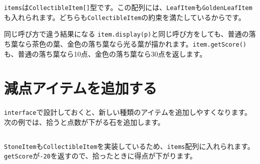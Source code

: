 \texttt{items}は\texttt{CollectibleItem[]}型です。この配列には、\texttt{LeafItem}も\texttt{GoldenLeafItem}も入れられます。どちらも\texttt{CollectibleItem}の約束を満たしているからです。

\begin{pointbox}{同じ呼び方で違う結果になる}
\texttt{item.display(p)}と同じ呼び方をしても、普通の落ち葉なら茶色の葉、金色の落ち葉なら光る葉が描かれます。\texttt{item.getScore()}も、普通の落ち葉なら10点、金色の落ち葉なら30点を返します。
\end{pointbox}

\section{減点アイテムを追加する}

\texttt{interface}で設計しておくと、新しい種類のアイテムを追加しやすくなります。次の例では、拾うと点数が下がる石を追加します。

\begin{listing}[htbp]
\inputminted{ts}{typescript-p5/listings/chapter19/harmful-item.ts}
\caption{減点される石とランダムなアイテム追加（\texttt{chapter19/harmful-item.ts}）}
\label{lst:chapter19-harmful-item}
\end{listing}

\texttt{StoneItem}も\texttt{CollectibleItem}を実装しているため、\texttt{items}配列に入れられます。\texttt{getScore}が\texttt{-20}を返すので、拾ったときに得点が下がります。

